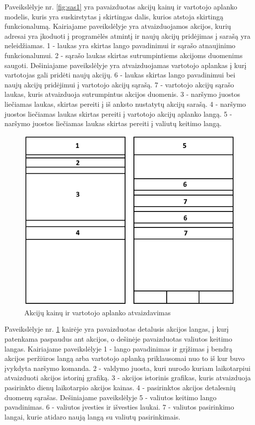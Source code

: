 \documentclass[a4paper,12pt,fleqn]{article}
\begin{document}
Paveikslėlyje nr. \ref{fig:sas1} yra pavaizduotas akcijų kainų ir vartotojo aplanko modelis, kuris yra suskirstytas į skirtingas dalis, kurios atstoja skirtingą funkcionalumą. Kairiajame paveikslėlyje yra atvaizduojamos akcijos, kurių adresai yra įkoduoti į programėlės atmintį ir naujų akcijų pridėjimas į sarašą yra neleidžiamas. 1 - laukas yra skirtas lango pavadinimui ir sąrašo atnaujinimo funkcionalumui. 2 - sąrašo laukas skirtas sutrumpintiems akcijoms duomenims saugoti. Dešiniajame paveikslėlyje yra atvaizduojamas vartotojo aplankas į kurį vartotojas gali pridėti naujų akcijų. 6 - laukas skirtas lango pavadinimui bei naujų akcijų pridėjimui į vartotojo akcijų sąrašą. 7 - vartotojo akcijų sąrašo laukas, kuris atvaizduoja sutrumpintus akcijos duomenis. 3 - naršymo juostos liečiamas laukas, skirtas pereiti į iš anksto nustatytų akcijų sarašą. 4 - naršymo juostos liečiamas laukas skirtas pereiti į vartotojo akcijų aplanko langą. 5 - naršymo juostos liečiamas laukas skirtas pereiti į valiutų keitimo langą.

\newpage
\begin{figure}[h]
	\centering
	\includegraphics[width=0.55\linewidth]{vartotojo-sasaja2.png}
	\caption{Akcijų kainų ir vartotojo aplanko atvaizdavimas}
	\label{fig:sas2}
\end{figure}
Paveikslėlyje nr. \ref{fig:sas2} kairėje yra pavaizduotas detalusis akcijos langas, į kurį patenkama paspaudus ant akcijos, o dešinėje pavaizduotas valiutos keitimo langas. Kairiajame paveikslėlyje 1 - lango pavadinimas ir grįžimas į bendrą akcijos peržiūros langą arba vartotojo aplanką priklausomai nuo to iš kur buvo įvykdyta naršymo komanda. 2 - valdymo juosta, kuri nurodo kuriam laikotarpiui atvaizduoti akcijos istorinį grafiką. 3 - akcijos istorinis grafikas, kuris atvaizduoja pasirinkto dienų laikotarpio akcijos kainas. 4 - pasirinktos akcijos detalesnių duomenų sąrašas. Dešiniajame paveikslėlyje 5 - valiutos keitimo lango pavadinimas. 6 - valiutos įvesties ir išvesties laukai. 7 - valiutos pasirinkimo langai, kurie atidaro naują langą su valiutų pasirinkimais.
\end{document}

